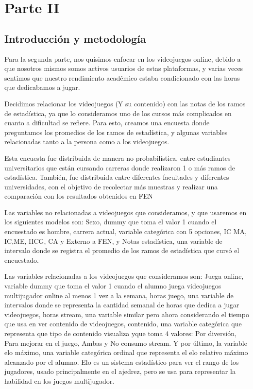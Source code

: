 \documentclass[11pt]{article}
\begin{document}
\newpage

\section{Parte II}

\subsection{Introducción y metodología}

Para la segunda parte, nos quisimos enfocar en los videojuegos online, debido a que nosotros mismos somos activos usuarios de estas plataformas, y varias veces sentimos que nuestro rendimiento académico estaba condicionado con las horas que dedicabamos a jugar.

Decidimos relacionar los videojuegos (Y su contenido) con las notas de los ramos de estadística, ya que lo consideramos uno de los cursos más complicados en cuanto a dificultad se refiere. Para esto, creamos una encuesta donde preguntamos los promedios de los ramos de estadística, y algunas variables relacionadas tanto a la persona como a los videojuegos.

Esta encuesta fue distribuida de manera no probabilística, entre estudiantes universitarios que están cursando carreras donde realizaron 1 o más ramos de estadística. También, fue distribuida entre diferentes facultades y diferentes universidades, con el objetivo de recolectar más muestras y realizar una comparación con los resultados obtenidos en FEN

Las variables no relacionadas a videojuegos que consideramos, y que usaremos en los siguientes modelos son: Sexo, dummy que toma el valor 1 cuando el encuestado es hombre, carrera actual, variable categórica con 5 opciones, IC MA, IC,ME, IICG, CA y Externo a FEN, y Notas estadística, una variable de intervalo donde se registra el promedio de los ramos de estadística que cursó el encuestado.

Las variables relacionadas a los videojuegos que consideramos son: Juega online, variable dummy que toma el valor 1 cuando el alumno juega videojuegos multijugador online al menos 1 vez a la semana, horas juego, una variable de intervalos donde se representa la cantidad semanal de horas que dedica a jugar videojuegos, horas stream, una variable similar pero ahora considerando el tiempo que usa en ver contenido de videojuegos, contenido, una variable categórica que representa que tipo de contenido visualiza yque toma 4 valores: Por diversión, Para mejorar en el juego, Ambas y No consumo stream. Y por último, la variable elo máximo, una variable categórica ordinal que representa el elo relativo máximo alcanzado por el alumno. Elo es un sistema estadístico para ver el rango de los jugadores, usado principalmente en el ajedrez, pero se usa para representar la habilidad en los juegos multijugador.
\end{document}

